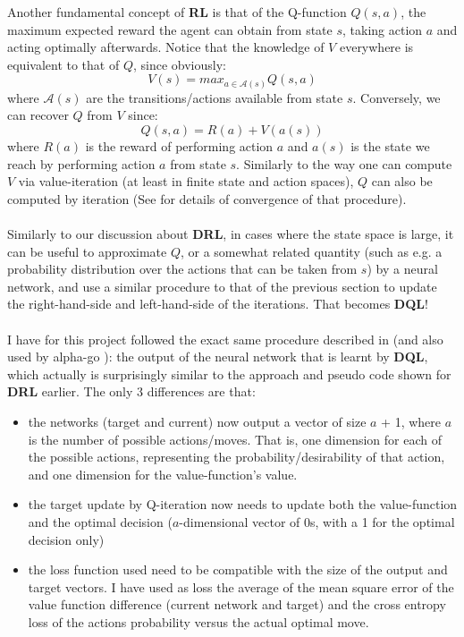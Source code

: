 Another fundamental concept of \textbf{RL} is that of the Q-function $Q(s, a)$, the maximum expected reward the agent can obtain from state $s$, taking action $a$ and acting optimally afterwards. Notice that the knowledge of $V$ everywhere is equivalent to that of $Q$, since obviously:
\begin{equation} \label{eq:QI}
V(s) = max_{a \in \mathcal{A}(s)} Q(s, a)
\end{equation}
where $\mathcal{A}(s)$ are the transitions/actions available from state $s$. Conversely, we can recover $Q$ from $V$ since:
\begin{equation} \label{eq:QI2}
Q(s, a) = R(a) + V(a(s))
\end{equation}
where $R(a)$ is the reward of performing action $a$ and $a(s)$ is the state we reach by performing action $a$ from state $s$. Similarly to the way one can compute $V$ via value-iteration (at least in finite state and action spaces), $Q$ can also be computed by iteration (See \cite{Watkins1992} for details of convergence of that procedure).
\\
\\
Similarly to our discussion about \textbf{DRL}, in cases where the state space is large, it can be useful to approximate $Q$, or a somewhat related quantity (such as e.g. a probability distribution over the actions that can be taken from $s$) by a neural network, and use a similar procedure to that of the previous section to update the right-hand-side and left-hand-side of the iterations. That becomes \textbf{DQL}!
\\
\\
I have for this project followed the exact same procedure described in \cite{https://doi.org/10.48550/arxiv.1805.07470} (and also used by alpha-go \cite{AlphaGo}): the output of the neural network that is learnt by \textbf{DQL}, which actually is surprisingly similar to the approach and pseudo code shown for \textbf{DRL} earlier. The only 3 differences are that:
\begin{itemize}
\item the networks (target and current) now output a vector of size $a$ + 1, where $a$ is the number of possible actions/moves. That is, one dimension for each of the possible actions, representing the probability/desirability of that action, and one dimension for the value-function's value.
\item the target update by Q-iteration now needs to update both the value-function and the optimal decision ($a$-dimensional vector of 0s, with a 1 for the optimal decision only)
\item the loss function used need to be compatible with the size of the output and target vectors. I have used as loss the average of the mean square error of the value function difference (current network and target) and the cross entropy loss of the actions probability versus the actual optimal move.
\end{itemize}
